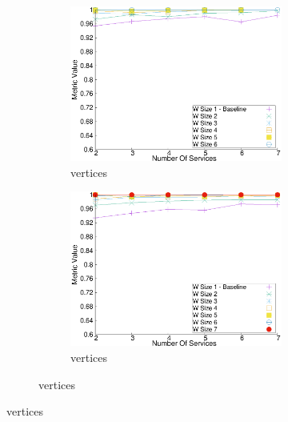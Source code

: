 \begin{figure}[H]
\begin{adjustbox}{minipage=\linewidth,scale=0.75}
\begin{subfigure}{0.45\textwidth}
      \begin{subfigure}{\textwidth}
        \includegraphics[width=\textwidth]{Images/graphs/window_quality_performance_diff_qual_n7_s7_50_80_n6}
        \caption{ vertices}
        \label{fig:quality_window_average_qualitative_n6}
      \end{subfigure}


      \begin{subfigure}{\textwidth}
        \includegraphics[width=\textwidth]{Images/graphs/window_quality_performance_diff_qual_n7_s7_50_80_n7}
        \caption{ vertices}
        \label{fig:quality_window_average_qualitative_n7}
      \end{subfigure}

    \end{subfigure}


\end{adjustbox}
\end{figure}
